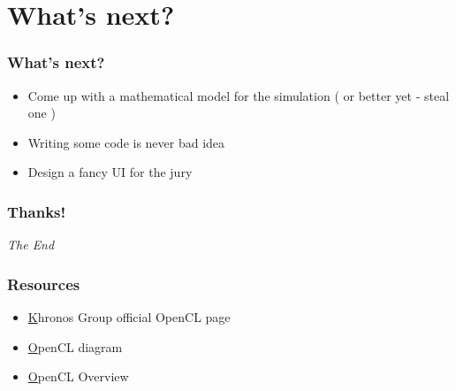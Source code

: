 \documentclass{beamer}
\begin{document}
  \section{What's next?}

  \frame
  {
    \frametitle{What's next?}

    \begin{itemize}
    \item<1-> Come up with a mathematical model for the simulation ( or better yet - steal one )
    \item<2-> Writing some code is never bad idea
    \item<3-> Design a fancy UI for the jury
    \end{itemize}
  }
  
  \frame
  {
	\frametitle{Thanks!}
	\begin{center}
		\Large \emph{The End}
	\end{center}
  }
  
  \frame
  {
	\frametitle{Resources}  
	\begin{itemize}
	  	\item \href{http://www.khronos.org/opencl/} Khronos Group official OpenCL page
  		\item \href{http://www.fixstars.com/en/opencl/book/OpenCLProgrammingBook/dtp_462724_USER_CONTENT_0_html_m3285f80d.jpg} OpenCL diagram
  		\item \href{http://www.khronos.org/assets/uploads/developers/library/overview/opencl-overview.pdf} OpenCL Overview
	\end{itemize}	  
  }
\end{document}
